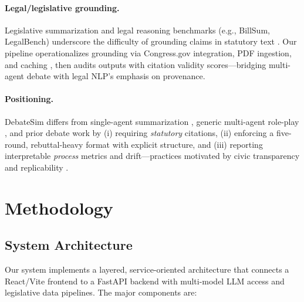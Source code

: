 \documentclass{article}
\begin{document}
\paragraph{Legal/legislative grounding.}
Legislative summarization and legal reasoning benchmarks (e.g., BillSum, LegalBench) underscore the difficulty of grounding claims in statutory text \citep{Kornilova2019BillSum,LegalBench2023}. Our pipeline operationalizes grounding via Congress.gov integration, PDF ingestion, and caching \citep{CongressGovAPI2025}, then audits outputs with citation validity scores—bridging multi-agent debate with legal NLP’s emphasis on provenance.

\paragraph{Positioning.}
DebateSim differs from single-agent summarization \citep{Kornilova2019BillSum}, generic multi-agent role-play \citep{Li2023CAMEL,Park2023GenerativeAgents}, and prior debate work \citep{Irving2018AISafetyDebate} by (i) requiring \emph{statutory} citations, (ii) enforcing a five-round, rebuttal-heavy format with explicit structure, and (iii) reporting interpretable \emph{process} metrics and drift—practices motivated by civic transparency and replicability \citep{Wang2023AIpolicyReview,Bai2022ConstitutionalAI}.


\section{Methodology}

\subsection{System Architecture}

Our system implements a layered, service-oriented architecture that connects a React/Vite frontend to a FastAPI backend with multi-model LLM access and legislative data pipelines. The major components are:
\end{document}
